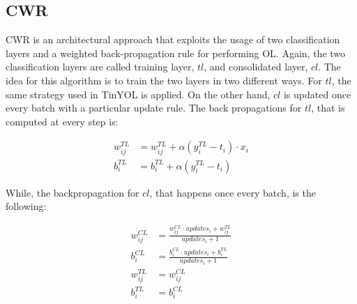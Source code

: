 \documentclass[12pt]{report}
\begin{document}
\subsection{CWR}
CWR is an architectural approach that exploits the usage of two classification layers and a weighted back-propagation rule for performing OL. Again, the two classification layers are called training layer, $tl$, and consolidated layer, $cl$. The idea for this algorithm is to train the two layers in two different ways. For $tl$, the same strategy used in TinYOL is applied. On the other hand, $cl$ is updated once every batch with a particular update rule. The back propagations for $tl$, that is computed at every step is:

\begin{align}
	w^{TL}_{ij} &= w^{TL}_{ij} + \alpha (y^{TL}_i - t_i) \cdot x_i \\
    b^{TL}_i    &= b^{TL}_i + \alpha  (y^{TL}_i - t_i) 
\end{align}

While, the backpropagation for $cl$, that happens once every batch, is the following:

\begin{align}
	w^{CL}_{ij} &= \frac{w^{CL}_{ij} \cdot updates_{i} + w^{TL}_{ij}}{updates_{i} + 1} \label{cwrweight}\\ 
	b^{CL}_{i}  &= \frac{b^{CL}_{i} \cdot updates_{i} + b^{TL}_{i}}{updates_{i} + 1} \\ 
    w^{TL}_{ij} &=  w^{CL}_{ij} \\
    b^{TL}_{i}  &=  b^{CL}_{i} 
\end{align}
\end{document}
